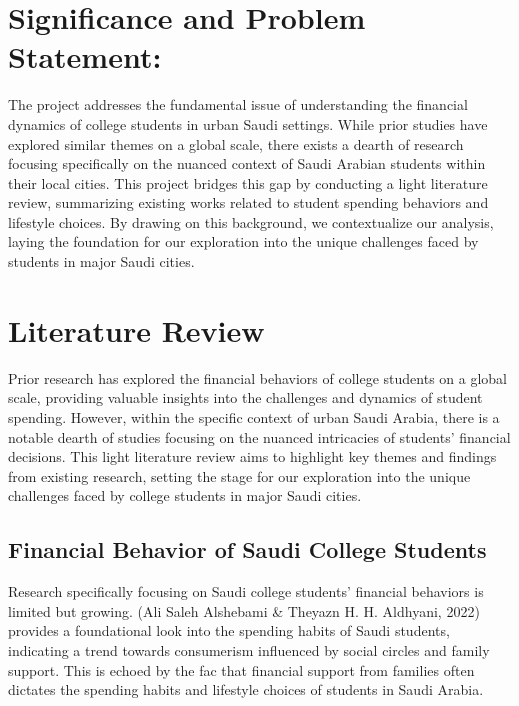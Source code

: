 \documentclass[
]{article}
\begin{document}
\hypertarget{significance-and-problem-statement}{%
\section{Significance and Problem
Statement:}\label{significance-and-problem-statement}}

The project addresses the fundamental issue of understanding the
financial dynamics of college students in urban Saudi settings. While
prior studies have explored similar themes on a global scale, there
exists a dearth of research focusing specifically on the nuanced context
of Saudi Arabian students within their local cities. This project
bridges this gap by conducting a light literature review, summarizing
existing works related to student spending behaviors and lifestyle
choices. By drawing on this background, we contextualize our analysis,
laying the foundation for our exploration into the unique challenges
faced by students in major Saudi cities.

\hypertarget{literature-review}{%
\section{Literature Review}\label{literature-review}}

Prior research has explored the financial behaviors of college students
on a global scale, providing valuable insights into the challenges and
dynamics of student spending. However, within the specific context of
urban Saudi Arabia, there is a notable dearth of studies focusing on the
nuanced intricacies of students' financial decisions. This light
literature review aims to highlight key themes and findings from
existing research, setting the stage for our exploration into the unique
challenges faced by college students in major Saudi cities.

\hypertarget{financial-behavior-of-saudi-college-students}{%
\subsection{Financial Behavior of Saudi College
Students}\label{financial-behavior-of-saudi-college-students}}

Research specifically focusing on Saudi college students' financial
behaviors is limited but growing. (Ali Saleh Alshebami \& Theyazn H. H.
Aldhyani, 2022) provides a foundational look into the spending habits of
Saudi students, indicating a trend towards consumerism influenced by
social circles and family support. This is echoed by the fac that
financial support from families often dictates the spending habits and
lifestyle choices of students in Saudi Arabia.
\end{document}
